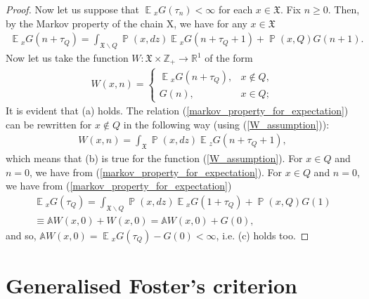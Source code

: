 \documentclass[10pt, reqno]{amsart}
\theoremstyle{definition}
\newcommand{\aasVar}{Q} %
\newcommand{\astVar}{\tau} %
\newcommand{\gtfVar}{G} %
\newcommand{\wtfVar}{W} %
\newcommand{\atoVar}{\mathbb{A}} %
\newcommand{\assVar}{\mathfrak{X}} %
\newcommand{\integers}{\mathbb{Z}} %
\newcommand{\reals}{\mathbb{R}} %
\DeclareMathOperator*{\E}{\mathbb{E}}
\DeclareMathOperator*{\Pb}{\mathbb{P}}
\begin{document}
\begin{proof}
		Now let us suppose that $\E{}_{x}\gtfVar(\astVar_{n}) < \infty$ for each $x \in \assVar$. Fix $n \geq 0$. Then, by the Markov property of the chain X, we have for any $x \in \assVar$
		\begin{gather}
			\E{}_{x}\gtfVar(n + \astVar_{\aasVar}) = \int_{\assVar\backslash\aasVar}\Pb(x, dz)\E{}_{x}\gtfVar(n + \astVar_{\aasVar} + 1) + \Pb(x, \aasVar)\gtfVar(n+1).
			\label{markov_property_for_expectation}
		\end{gather}
		Now let us take the function $\wtfVar : \assVar \times \integers_{+} \xrightarrow{} \reals^{1}$ of the form
		\begin{gather}
			\wtfVar(x, n) = \begin{cases}
				\E{}_{x}\gtfVar(n + \astVar_{\aasVar}), & x \notin Q,\\
				\gtfVar(n), & x \in \aasVar;
			\end{cases}
			\label{W_assumption}
		\end{gather}
		It is evident that (a) holds. The relation (\ref{markov_property_for_expectation}) can be rewritten for $x \notin \aasVar$ in the following way (using (\ref{W_assumption})):
		\begin{gather*}
			\wtfVar(x, n) = \int_{\assVar}\Pb(x, dz)\E{}_{z}\gtfVar(n + \astVar_{\aasVar} + 1),
		\end{gather*}
		which means that (b) is true for the function (\ref{W_assumption}). For $x \in \aasVar$ and $n = 0$, we have from (\ref{markov_property_for_expectation}). For $x \in \aasVar$ and $n = 0$, we have from (\ref{markov_property_for_expectation})
		\begin{gather*}
			\E{}_{x}\gtfVar(\astVar_{\aasVar}) = \int_{\assVar \backslash \aasVar}\Pb(x, dz)\E{}_{x}\gtfVar(1 + \astVar_{\aasVar}) + \Pb(x, \aasVar)\gtfVar(1) \\ \equiv \atoVar\wtfVar(x, 0) + \wtfVar(x, 0) = \atoVar\wtfVar(x, 0) + \gtfVar(0),
		\end{gather*}
		and so, $\atoVar\wtfVar(x, 0) = \E{}_{x}\gtfVar(\astVar_{\aasVar}) - \gtfVar(0) < \infty$, i.e. (c) holds too.
	\end{proof}
	
	\newpage
	
	\section{Generalised Foster's criterion}
	\newcommand{\hffVar}{h} %
	\newcommand{\gffVar}{g} %
	\newcommand{\cefVar}{\mathcal{E}} %
	\newcommand{\indicator}{\mathds{1}} %
	
\end{document}
